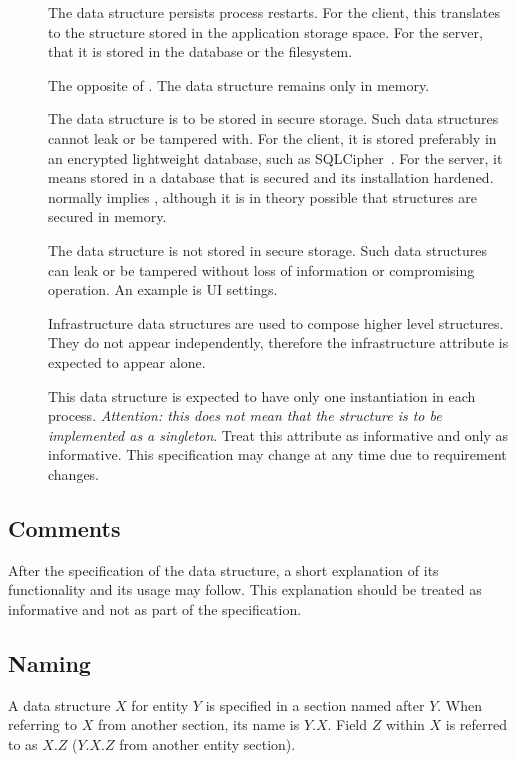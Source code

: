 \documentclass[a4paper,10pt,draft]{article}
\begin{document}
\begin{description}
 \item[\persistent] The data structure persists process restarts. For the client, this translates to the structure stored in the application storage space. For the server, that it 
is stored in the database or the filesystem.
 \item[\ephemeral] The opposite of \persistent. The data structure remains only in memory.
 \item[\secure] The data structure is to be stored in secure storage. Such data structures cannot leak or be tampered with. For the client, it is stored preferably in an encrypted 
lightweight database, such as SQLCipher~\cite{sql_cipher}. For the server, it means stored in a database that is secured and its installation hardened. \secure{} normally implies 
\persistent, although it is in theory possible that \ephemeral{} structures are secured in memory.
 \item[\unsecure] The data structure is not stored in secure storage. Such data structures can leak or be tampered without loss of information or compromising operation. An example 
is UI settings.
 \item[\infrastructure] Infrastructure data structures are used to compose higher level structures. They do not appear independently, therefore the infrastructure attribute is 
expected to appear alone.
 \item[\unique] This data structure is expected to have only one instantiation in each process. {\em Attention: this does not mean that the structure is to be implemented as a 
singleton}. Treat this attribute as informative and only as informative. This specification may change at any time due to requirement changes.
\end{description}

\subsection{Comments}
After the specification of the data structure, a short explanation of its functionality and its usage may follow. This explanation should be treated as informative and not as part 
of the specification.

\subsection{Naming}
A data structure $X$ for entity $Y$ is specified in a section named after $Y$. When referring to $X$ from another section, its name is $Y.X$. Field $Z$ within $X$ is referred to 
as $X.Z$ ($Y.X.Z$ from another entity section).
\end{document}
